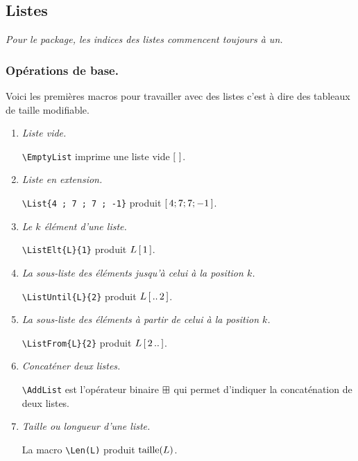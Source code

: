 \documentclass[12pt,a4paper]{article}
\begin{document}

\subsection{Listes}

\begin{frame-gene}
	\centering\itshape
	Pour le package, les indices des listes commencent toujours à un. 
\end{frame-gene}


\subsubsection{Opérations de base.}

Voici les premières macros pour travailler avec des listes c'est à dire des tableaux de taille modifiable.

\begin{enumerate}
	\item \textit{Liste vide.}

		  \verb+\EmptyList+ imprime une liste vide $\left[ \,  \, \right]$.


	\item \textit{Liste en extension.}

		  \verb+\List{4 ; 7 ; 7 ; -1}+ produit $\left[ \, 4 ; 7 ; 7 ; -1 \, \right]$.


	\item \textit{Le $k$\ieme{} élément d'une liste.}

		  \verb+\ListElt{L}{1}+ produit $L\left[ \, 1 \, \right]$.


	\item \textit{La sous-liste des éléments jusqu'à celui à la position $k$.}

		  \verb+\ListUntil{L}{2}+ produit $L\left[ \, ..\,2 \, \right]$.


	\item \textit{La sous-liste des éléments à partir de celui à la position $k$.}

		  \verb+\ListFrom{L}{2}+ produit $L\left[ \, 2\,.. \, \right]$.


	\item \textit{Concaténer deux listes.}

		  \verb+\AddList+ est l'opérateur binaire $\mathbin{\boxplus}$ qui permet d'indiquer la concaténation de deux listes.


	\item \textit{Taille ou longueur d'une liste.}

		  La macro \verb+\Len(L)+ produit $\operatorname{taille}(L)$.
\end{enumerate}
\end{document}
